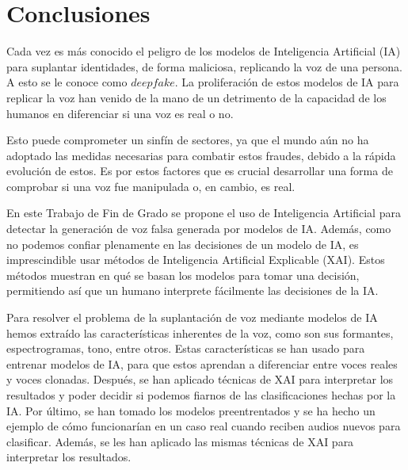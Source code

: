 \chapter{Conclusiones}
\label{chap:conclusiones}


Cada vez es más conocido el peligro de los modelos de Inteligencia Artificial (IA) para suplantar identidades, de forma maliciosa, replicando la voz de una persona. A esto se le conoce como $deepfake$. La proliferación de estos modelos de IA para replicar la voz han venido de la mano de un detrimento de la capacidad de los humanos en diferenciar si una voz es real o no.

Esto puede comprometer un sinfín de sectores, ya que el mundo aún no ha adoptado las medidas necesarias para combatir estos fraudes, debido a la rápida evolución de estos. Es por estos factores que es crucial desarrollar una forma de comprobar si una voz fue manipulada o, en cambio, es real. 

En este Trabajo de Fin de Grado se propone el uso de Inteligencia Artificial para detectar la generación de voz falsa generada por modelos de IA. Además, como no podemos confiar plenamente en las decisiones de un modelo de IA, es imprescindible usar métodos de Inteligencia Artificial Explicable (XAI). Estos métodos muestran en qué se basan los modelos para tomar una decisión, permitiendo así que un humano interprete fácilmente las decisiones de la IA.


Para resolver el problema de la suplantación de voz mediante modelos de IA hemos extraído las características inherentes de la voz, como son sus formantes, espectrogramas, tono, entre otros. Estas características se han usado para entrenar modelos de IA, para que estos aprendan a diferenciar entre voces reales y voces clonadas. Después, se han aplicado técnicas de XAI para interpretar los resultados y poder decidir si podemos fiarnos de las clasificaciones hechas por la IA. Por último, se han tomado los modelos preentrentados y se ha hecho un ejemplo de cómo funcionarían en un caso real cuando reciben audios nuevos para clasificar. Además, se les han aplicado las mismas técnicas de XAI para interpretar los resultados.


